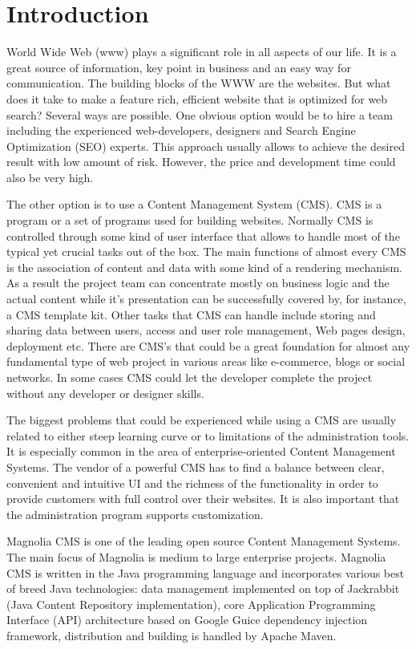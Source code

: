\chapter{Introduction}

World Wide Web (www) plays a significant role in all aspects of our life. It is
a great source of information, key point in business and an easy way for
communication. The building blocks of the WWW are the websites. But what does it
take to make a feature rich, efficient website that is optimized for web search?
Several ways are possible. One obvious option would be to hire a team including
the experienced web-developers, designers and Search Engine Optimization (SEO)
experts. This approach usually allows to achieve the desired result with low
amount of risk. However, the price and development time could also be very high.

The other option is to use a Content Management System (CMS). CMS is a program
or a set of programs used for building websites. Normally CMS is controlled
through some kind of user interface that allows to handle most of the typical
yet crucial tasks out of the box. The main functions of almost every CMS is the
association of content and data with some kind of a rendering mechanism. As a
result the project team can concentrate mostly on business logic and the actual
content while it's presentation can be successfully covered by, for instance, a
CMS template kit. Other tasks that CMS can handle include storing and sharing
data between users, access and user role management, Web pages design,
deployment etc. There are CMS's that could be a great foundation for almost any
fundamental type of web project in various areas like e-commerce, blogs or
social networks. In some cases CMS could let the developer complete the project
without any developer or designer skills.

The biggest problems that could be experienced while using a CMS are usually
related to either steep learning curve or to limitations of the administration
tools. It is especially common in the area of enterprise-oriented Content
Management Systems. The vendor of a powerful CMS has to find a balance between
clear, convenient and intuitive UI and the richness of the functionality in
order to provide customers with full control over their websites. It is also
important that the administration program supports customization.

Magnolia CMS is one of the leading open source Content Management Systems. The
main focus of Magnolia is medium to large enterprise projects. Magnolia CMS is
written in the Java programming language and incorporates various best of breed
Java technologies: data management implemented on top of Jackrabbit (Java
Content Repository implementation), core Application Programming Interface (API)
architecture based on Google Guice dependency injection framework, distribution
and building is handled by Apache Maven.

